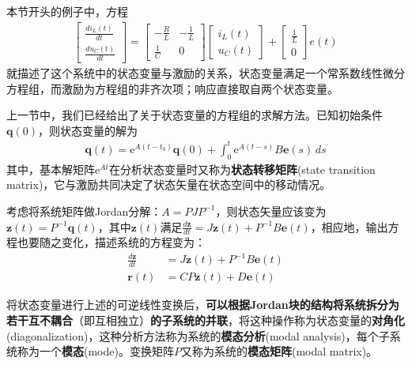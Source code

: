 \documentclass{ctexbook}
\begin{document}
\begin{example}
    本节开头的例子中，方程\begin{align*}
            \begin{bmatrix}
                \frac{di_L(t)}{dt}\\
                \frac{du_C(t)}{dt}
            \end{bmatrix}=
            \begin{bmatrix}
                -\frac{R}{L} & -\frac{1}{L}\\
                \frac{1}{C} & 0
            \end{bmatrix}
            \begin{bmatrix}
                i_L(t)\\
                u_C(t)
            \end{bmatrix}+
            \begin{bmatrix}
                \frac{1}{L}\\
                0
            \end{bmatrix}e(t)
        \end{align*}
    就描述了这个系统中的状态变量与激励的关系，状态变量满足一个常系数线性微分方程组，而激励为方程组的非齐次项；响应直接取自两个状态变量。
\end{example}

上一节中，我们已经给出了关于状态变量的方程组的求解方法。已知初始条件$\mathbf{q}(0)$，则状态变量的解为\begin{align*}
    \mathbf{q}(t)=\mathrm{e}^{A(t-t_0)}\mathbf{q}(0)+\int_{0}^t \mathrm{e}^{A(t-s)}B\mathbf{e}(s)\,ds
\end{align*}
其中，基本解矩阵$\mathrm{e}^{At}$在分析状态变量时又称为\textbf{状态转移矩阵}(state transition matrix)，它与激励共同决定了状态矢量在状态空间中的移动情况。

考虑将系统矩阵做Jordan分解：$A=PJP^{-1}$，则状态矢量应该变为$\mathbf{z}(t)=P^{-1}\mathbf{q}(t)$，其中$\mathbf{z}(t)$满足$\frac{d\mathbf{z}}{dt}=J\mathbf{z}(t)+P^{-1}B\mathbf{e}(t)$，相应地，输出方程也要随之变化，描述系统的方程变为：\begin{align*}
    \frac{d\mathbf{z}}{dt}&=J\mathbf{z}(t)+P^{-1}B\mathbf{e}(t)\\
    \mathbf{r}(t)&=CP\mathbf{z}(t)+D\mathbf{e}(t)
\end{align*}

将状态变量进行上述的可逆线性变换后，\textbf{可以根据Jordan块的结构将系统拆分为若干互不耦合}（即互相独立）\textbf{的子系统的并联}，将这种操作称为状态变量的\textbf{对角化}(diagonalization)，这种分析方法称为系统的\textbf{模态分析}(modal analysis)，每个子系统称为一个\textbf{模态}(mode)。变换矩阵$P$又称为系统的\textbf{模态矩阵}(modal matrix)。
\end{document}
